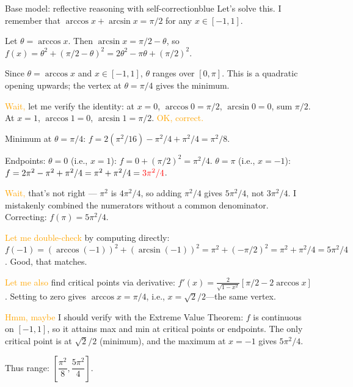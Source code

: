 \documentclass[11pt]{article}
\begin{document}
\begin{caseblock}{Base model: reflective reasoning with self-correction}{blue}
Let's solve this. I remember that \(\arccos x + \arcsin x = \pi/2\) for any \(x \in [-1,1]\).

Let \(\theta = \arccos x\). Then \(\arcsin x = \pi/2 - \theta\), so
\(f(x) = \theta^2 + (\pi/2 - \theta)^2 = 2\theta^2 - \pi\theta + (\pi/2)^2\).

Since \(\theta = \arccos x\) and \(x \in [-1,1]\), \(\theta\) ranges over \([0, \pi]\).
This is a quadratic opening upwards; the vertex at \(\theta = \pi/4\) gives the minimum.

\textcolor{orange}{Wait,} let me verify the identity: at \(x=0\), \(\arccos 0 = \pi/2\), \(\arcsin 0 = 0\), sum \(\pi/2\). At \(x=1\), \(\arccos 1 = 0\), \(\arcsin 1 = \pi/2\). \textcolor{orange}{OK, correct.}

Minimum at \(\theta = \pi/4\): \(f = 2(\pi^2/16) - \pi^2/4 + \pi^2/4 = \pi^2/8\).

Endpoints: \(\theta = 0\) (i.e., \(x=1\)): \(f = 0 + (\pi/2)^2 = \pi^2/4\).
\(\theta = \pi\) (i.e., \(x=-1\)): \(f = 2\pi^2 - \pi^2 + \pi^2/4 = \pi^2 + \pi^2/4 = \textcolor{red}{3\pi^2/4}\).

\textcolor{orange}{Wait,} that's not right --- \(\pi^2\) is \(4\pi^2/4\), so adding \(\pi^2/4\) gives \(5\pi^2/4\), not \(3\pi^2/4\). I mistakenly combined the numerators without a common denominator. Correcting: \(f(\pi) = 5\pi^2/4\).

\textcolor{orange}{Let me double-check} by computing directly: \(f(-1) = (\arccos(-1))^2 + (\arcsin(-1))^2 = \pi^2 + (-\pi/2)^2 = \pi^2 + \pi^2/4 = 5\pi^2/4\). Good, that matches.

\textcolor{orange}{Let me also} find critical points via derivative:
\(f'(x) = \frac{2}{\sqrt{1-x^2}}[\pi/2 - 2\arccos x]\).
Setting to zero gives \(\arccos x = \pi/4\), i.e., \(x = \sqrt{2}/2\)---the same vertex.

\textcolor{orange}{Hmm, maybe} I should verify with the Extreme Value Theorem: \(f\) is continuous on \([-1,1]\), so it attains max and min at critical points or endpoints. The only critical point is at \(\sqrt{2}/2\) (minimum), and the maximum at \(x=-1\) gives \(5\pi^2/4\).

Thus range: \(\boxed{\left[ \dfrac{\pi^2}{8}, \dfrac{5\pi^2}{4} \right]}\).
\end{caseblock}
\end{document}
